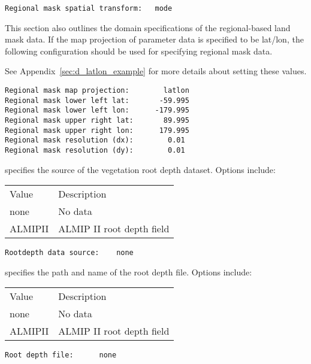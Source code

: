  \begin{Verbatim}[frame=single]
Regional mask spatial transform:   mode
 \end{Verbatim}

 
 This section also outlines the domain specifications of the
 regional-based land mask data.
 If the map projection of parameter data is specified to be lat/lon,
 the following configuration should be used for specifying regional
 mask data.
 
 See Appendix~\ref{sec:d_latlon_example} for more details about
 setting these values.
 

 \begin{Verbatim}[frame=single]
Regional mask map projection:        latlon
Regional mask lower left lat:       -59.995
Regional mask lower left lon:      -179.995
Regional mask upper right lat:       89.995
Regional mask upper right lon:      179.995
Regional mask resolution (dx):        0.01
Regional mask resolution (dy):        0.01
 \end{Verbatim}

 
  specifies the source
  of the vegetation root depth dataset.
  Options include:

 \begin{tabular}{ll}
 Value   & Description                         \\
 none    & No data         \\
 ALMIPII  & ALMIP II root depth field \\
 \end{tabular}
 

 \begin{Verbatim}[frame=single]
Rootdepth data source:    none
 \end{Verbatim}

 
  specifies the path
  and name of the root depth file.
  Options include:

 \begin{tabular}{ll}
 Value   & Description                         \\
 none    & No data         \\
 ALMIPII  & ALMIP II root depth field \\
 \end{tabular}
 

 \begin{Verbatim}[frame=single]
Root depth file:      none
 \end{Verbatim}


